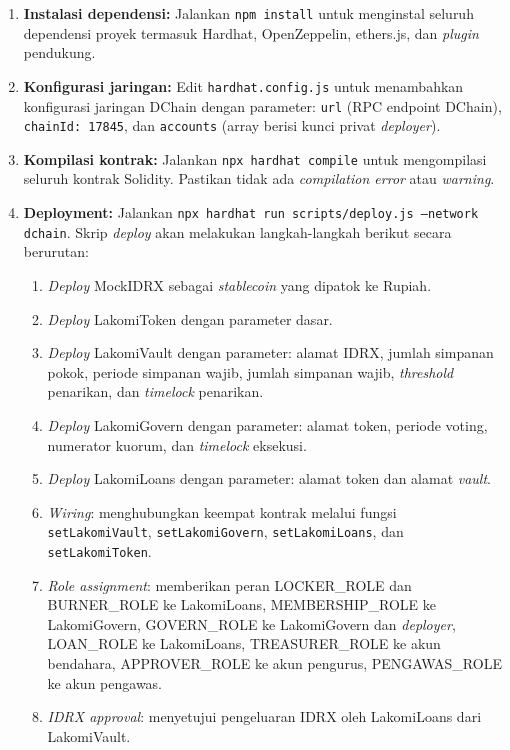 \begin{enumerate}
	\item \textbf{Instalasi dependensi:} Jalankan \texttt{npm install} untuk menginstal seluruh dependensi proyek termasuk Hardhat, OpenZeppelin, ethers.js, dan \textit{plugin} pendukung.
	\item \textbf{Konfigurasi jaringan:} Edit \texttt{hardhat.config.js} untuk menambahkan konfigurasi jaringan DChain dengan parameter: \texttt{url} (RPC endpoint DChain), \texttt{chainId: 17845}, dan \texttt{accounts} (array berisi kunci privat \textit{deployer}).
	\item \textbf{Kompilasi kontrak:} Jalankan \texttt{npx hardhat compile} untuk mengompilasi seluruh kontrak Solidity. Pastikan tidak ada \textit{compilation error} atau \textit{warning}.
	\item \textbf{Deployment:} Jalankan \texttt{npx hardhat run scripts/deploy.js --network dchain}. Skrip \textit{deploy} akan melakukan langkah-langkah berikut secara berurutan:
	\begin{enumerate}
		\item \textit{Deploy} MockIDRX sebagai \textit{stablecoin} yang dipatok ke Rupiah.
		\item \textit{Deploy} LakomiToken dengan parameter dasar.
		\item \textit{Deploy} LakomiVault dengan parameter: alamat IDRX, jumlah simpanan pokok, periode simpanan wajib, jumlah simpanan wajib, \textit{threshold} penarikan, dan \textit{timelock} penarikan.
		\item \textit{Deploy} LakomiGovern dengan parameter: alamat token, periode voting, numerator kuorum, dan \textit{timelock} eksekusi.
		\item \textit{Deploy} LakomiLoans dengan parameter: alamat token dan alamat \textit{vault}.
		\item \textit{Wiring}: menghubungkan keempat kontrak melalui fungsi \texttt{setLakomiVault}, \texttt{setLakomiGovern}, \texttt{setLakomiLoans}, dan \texttt{setLakomiToken}.
		\item \textit{Role assignment}: memberikan peran LOCKER\_ROLE dan BURNER\_ROLE ke LakomiLoans, MEMBERSHIP\_ROLE ke LakomiGovern, GOVERN\_ROLE ke LakomiGovern dan \textit{deployer}, LOAN\_ROLE ke LakomiLoans, TREASURER\_ROLE ke akun bendahara, APPROVER\_ROLE ke akun pengurus, PENGAWAS\_ROLE ke akun pengawas.
		\item \textit{IDRX approval}: menyetujui pengeluaran IDRX oleh LakomiLoans dari LakomiVault.
	\end{enumerate}

\end{enumerate}
